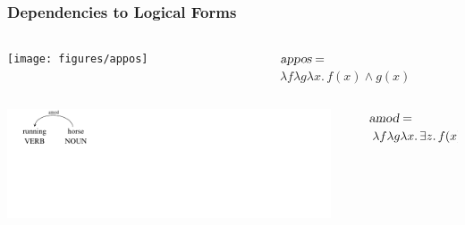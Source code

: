 \documentclass[mathserif,12pt]{beamer}
\renewcommand{\land}{\wedge}
\newcommand{\lspace}{.\,}
\begin{document}
\begin{frame}
\frametitle{Dependencies to Logical Forms}
 \vspace{0.6cm}
\begin{columns}
  \begin{column}{0.40\textwidth}
   \centering
  \vspace{-1em}
\texttt{[image: figures/appos]}   
  \end{column}
    \begin{column}{0.1\textwidth}
  \end{column}
  \begin{column}{0.58\textwidth}
    \large $\textsl{appos}  =$ \\ \hspace{0.5em} $ \lambda f \lambda g \lambda x \lspace f(x) \land g(x)$ \\
  \end{column}
 \end{columns}
 
 \vspace{0.6cm}
 \begin{columns}
  \begin{column}{0.39\textwidth}
   \centering
\includegraphics[trim=1.5em 10em 26em 0em,clip=true,scale=1.2]{figures/amod-verb}
  \end{column}
  \begin{column}{0.1\textwidth}
  \end{column}
  \begin{column}{0.59\textwidth}
\large    $\textsl{amod}= $ \\ \hspace{0.5em} $\lambda f \lambda g \lambda x \lspace \exists z \lspace f(x) \land g(z) \land \hbox{amod}^i(z_e, x_a)$ 
  \end{column}
  
 \end{columns}
 
\end{frame}
\end{document}
